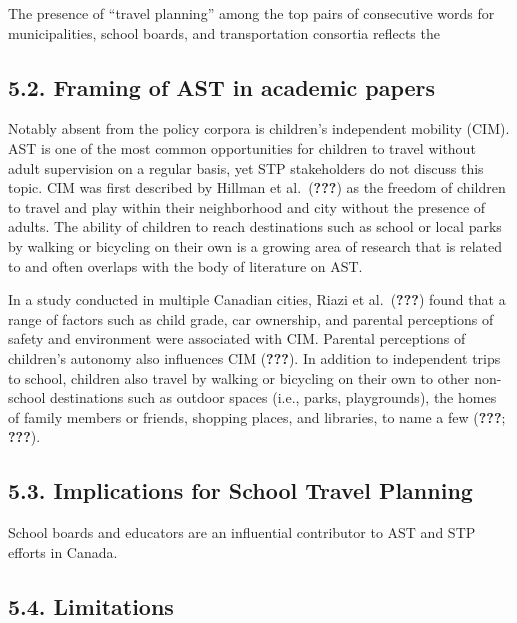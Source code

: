 \documentclass[]{elsarticle} %
\begin{document}
The presence of ``travel planning'' among the top pairs of consecutive
words for municipalities, school boards, and transportation consortia
reflects the

\hypertarget{framing-of-ast-in-academic-papers}{%
\subsection{5.2. Framing of AST in academic
papers}\label{framing-of-ast-in-academic-papers}}

Notably absent from the policy corpora is children's independent
mobility (CIM). AST is one of the most common opportunities for children
to travel without adult supervision on a regular basis, yet STP
stakeholders do not discuss this topic. CIM was first described by
Hillman et al.~({\textbf{???}}) as the freedom of children to travel and
play within their neighborhood and city without the presence of adults.
The ability of children to reach destinations such as school or local
parks by walking or bicycling on their own is a growing area of research
that is related to and often overlaps with the body of literature on
AST.

In a study conducted in multiple Canadian cities, Riazi et
al.~({\textbf{???}}) found that a range of factors such as child grade,
car ownership, and parental perceptions of safety and environment were
associated with CIM. Parental perceptions of children's autonomy also
influences CIM ({\textbf{???}}). In addition to independent trips to
school, children also travel by walking or bicycling on their own to
other non-school destinations such as outdoor spaces (i.e., parks,
playgrounds), the homes of family members or friends, shopping places,
and libraries, to name a few ({\textbf{???}}; {\textbf{???}}).

\hypertarget{implications-for-school-travel-planning}{%
\subsection{5.3. Implications for School Travel
Planning}\label{implications-for-school-travel-planning}}

School boards and educators are an influential contributor to AST and
STP efforts in Canada.

\hypertarget{limitations}{%
\subsection{5.4. Limitations}\label{limitations}}
\end{document}
